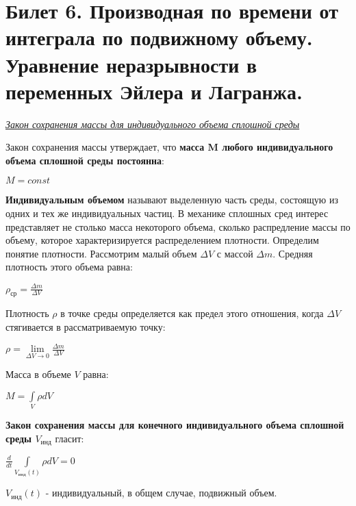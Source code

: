 \newpage
\section{Билет 6. Производная по времени от интеграла по подвижному объему. Уравнение неразрывности в переменных Эйлера и Лагранжа.}
\begin{center}
    \textit{\underline{Закон сохранения массы для индивидуального объема сплошной среды}}
\end{center}

Закон сохранения массы утверждает, что \textbf{масса M любого индивидуального объема сплошной среды постоянна}:
\begin{center}$
M = const
$\end{center}
\textbf{Индивидуальным объемом} называют выделенную часть среды, состоящую из одних и тех же индивидуальных частиц. В механике сплошных сред интерес представляет не столько масса некоторого объема, сколько распредление массы по объему, которое характеризируется распределением плотности. Определим понятие плотности. Рассмотрим малый объем $\Delta {V}$ с массой $\Delta m$. Средняя плотность этого объема равна:
\begin{center}$
\rho_{ср} = \frac{\Delta m}{\Delta V}
$\end{center}

Плотность $\rho$ в точке среды определяется как предел этого отношения, когда $\Delta V$ стягивается в рассматриваемую точку:
\begin{center}$
\rho = \lim\limits_{\Delta V \to 0} \frac{\Delta m}{\Delta V}
$\end{center}

Масса в объеме $V$ равна:
\begin{center}$
M = \int\limits_V \rho dV
$\end{center}

\textbf{Закон сохранения массы для конечного индивидуального объема сплошной среды $V_{инд}$} гласит:
\begin{center}$
\frac{d}{dt} \int\limits_{V_{инд}(t)} \rho dV = 0
$\end{center}

$V_{инд}(t)$ - индивидуальный, в общем случае, подвижный объем.

